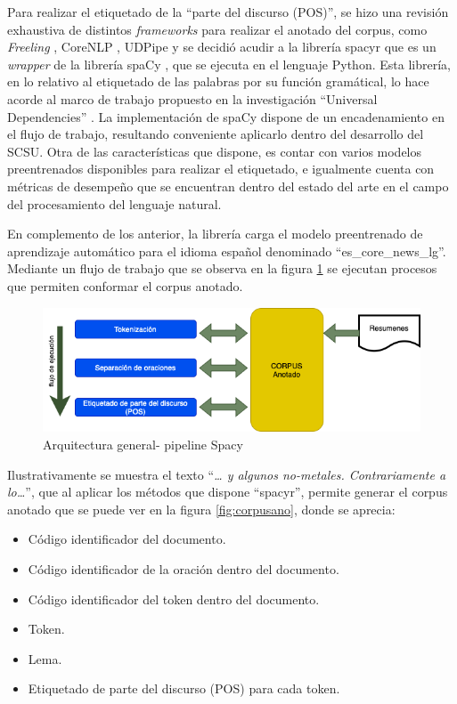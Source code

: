 \documentclass[
  12pt,
  openany]{book}
\begin{document}
Para realizar el etiquetado de la ``parte del discurso (POS)'', se hizo una revisión exhaustiva de distintos \emph{frameworks} para realizar el anotado del corpus, como \emph{Freeling} \citep{padro12}, CoreNLP \citep{manning-etal-2014-stanford}, UDPipe \citep{UDPipe-2} y se decidió acudir a la librería spacyr \citep{spacyr} que es un \emph{wrapper} de la librería spaCy \citep{spacy2020}, que se ejecuta en el lenguaje Python. Esta librería, en lo relativo al etiquetado de las palabras por su función gramátical, lo hace acorde al marco de trabajo propuesto en la investigación ``Universal Dependencies'' \citep{demarneffe2021}. La implementación de spaCy dispone de un encadenamiento en el flujo de trabajo, resultando conveniente aplicarlo dentro del desarrollo del SCSU. Otra de las características que dispone, es contar con varios modelos preentrenados disponibles para realizar el etiquetado, e igualmente cuenta con métricas de desempeño que se encuentran dentro del estado del arte en el campo del procesamiento del lenguaje natural.

En complemento de los anterior, la librería carga el modelo preentrenado de aprendizaje automático para el idioma español denominado ``es\_core\_news\_lg''. Mediante un flujo de trabajo que se observa en la figura \ref{fig:spacypi} se ejecutan procesos que permiten conformar el corpus anotado.

\begin{figure}

{\centering \includegraphics[width=0.8\linewidth]{images/05-desarrollo/2_ciclo/nlp/spacy_pipeline1} 

}

\caption{Arquitectura general- pipeline Spacy}\label{fig:spacypi}
\end{figure}

Ilustrativamente se muestra el texto ``\emph{\ldots{} y algunos no-metales. Contrariamente a lo\ldots{}}'', que al aplicar los métodos que dispone ``spacyr'', permite generar el corpus anotado que se puede ver en la figura \ref{fig:corpusano}, donde se aprecia:

\begin{itemize}
\item
  Código identificador del documento.
\item
  Código identificador de la oración dentro del documento.
\item
  Código identificador del token dentro del documento.
\item
  Token.
\item
  Lema.
\item
  Etiquetado de parte del discurso (POS) para cada token.
\end{itemize}
\end{document}
